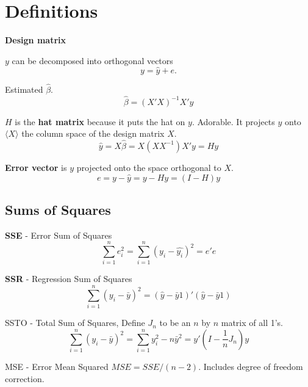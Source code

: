 \documentclass[12pt]{article}
\begin{document}
\section{Definitions}

\textbf{Design matrix}

$y$ can be decomposed into orthogonal vectors
\[
    y = \hat{y} + e.
\]

Estimated $\hat{\beta}$.
\[
    \hat{\beta} = (X'X)^{-1}X'y
\]

$H$ is the \textbf{hat matrix} because it puts the hat on $y$. Adorable. It projects
$y$ onto $\langle X \rangle$ the column space of the design matrix $X$.
\[
    \hat{y} = X \hat{\beta} = X(X X^{-1})X'y = Hy
\]

\textbf{Error vector} is $y$ projected onto the space orthogonal to $X$.
\[
    e = y - \hat{y} = y - Hy = (I - H)y
\]

\subsection{Sums of Squares}

\textbf{SSE} - Error Sum of Squares
\[
    \sum_{i=1}^n e_i^2 = \sum_{i=1}^n (y_i - \hat{y_i})^2
    = e'e
\]

\textbf{SSR} - Regression Sum of Squares
\[
    \sum_{i=1}^n (y_i - \bar{y})^2
    = (\hat{y} - \bar{y} 1)' (\hat{y} - \bar{y} 1) 
\]

SSTO - Total Sum of Squares, Define $J_n$ to be an $n$ by $n$ matrix of all 1's.
\[
    \sum_{i=1}^n (y_i - \bar{y})^2 = \sum_{i=1}^n y_i^2 - n\bar{y}^2
    = y'(I - \frac{1}{n} J_n)y
\]

MSE - Error Mean Squared $MSE = SSE / (n - 2)$. Includes degree of freedom
correction.
\end{document}
